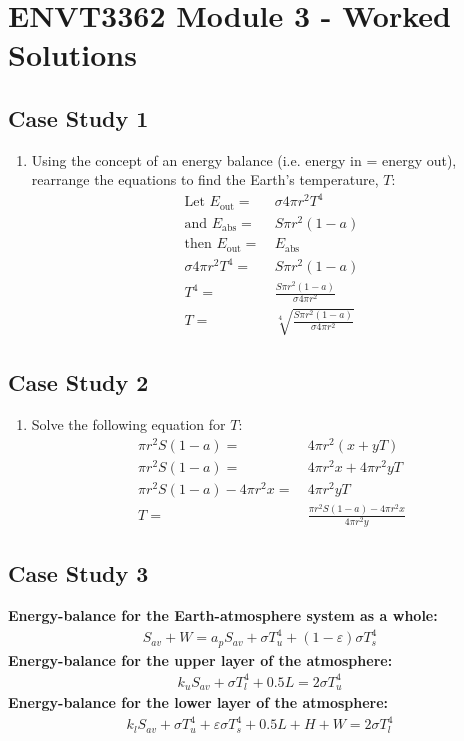 \documentclass[11pt]{article}
\begin{document}
\section*{ENVT3362 Module 3 - Worked Solutions}
\subsection*{Case Study 1}
\begin{enumerate}
	\item{Using the concept of an energy balance (i.e. energy in = energy out), rearrange the equations to find the Earth's temperature, $T$:
\begin{align*}
	\text{Let } E_{\text{out}} = &\ \sigma 4\pi r^{2} T^{4}\\
	\text{and  } E_{\text{abs}} = &\ S\pi r^{2} (1-a)\\
	\text{then }E_{\text{out}} = &\ E_{\text{abs}}\\
	\sigma 4\pi r^{2} T^{4} = &\ S\pi r^{2} (1-a) \\
	T^{4} = &\ \frac{S\pi r^{2} (1-a)}{\sigma 4\pi r^{2}}\\
	T = &\ \sqrt[4]{\frac{S\pi r^{2} (1-a)}{\sigma 4\pi r^{2}}}
\end{align*}
} 
\end{enumerate}

\subsection*{Case Study 2}
\begin{enumerate}
	\item{Solve the following equation for $T$:
	\begin{align*}
	\pi r^{2} S (1-a) =&\ 4\pi r^{2}(x+yT)\\
	\pi r^{2} S (1-a) =&\ 4\pi r^{2}x + 4\pi r^{2}yT\\
	\pi r ^{2}S(1-a) - 4\pi r^{2}x =&\ 4\pi r^{2}yT\\
	T =&\ \frac{\pi r ^{2}S(1-a) - 4\pi r^{2}x}{4\pi r^{2}y}
\end{align*}
	}
\end{enumerate}

\subsection*{Case Study 3}
\textbf{Energy-balance for the Earth-atmosphere system as a whole:}
\begin{align}\label{eq:3a}
	S_{av} + W = a_{p}S_{av} + \sigma T_{u}^{4} + (1 - \varepsilon)\sigma T_{s}^{4}
\end{align}
\textbf{Energy-balance for the upper layer of the atmosphere:}
\begin{align}\label{eq:3b}
	k_{u}S_{av} + \sigma T_{l}^{4} + 0.5L = 2\sigma T_{u}^{4}
\end{align}
\textbf{Energy-balance for the lower layer of the atmosphere:}
\begin{align}\label{eq:3c}
	k_{l}S_{av} + \sigma T_{u}^{4} + \varepsilon \sigma T_{s}^{4} + 0.5L + H + W = 2\sigma T_{l}^{4}
\end{align}
\end{document}
